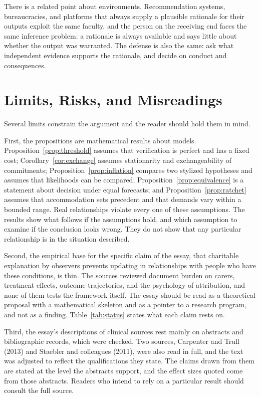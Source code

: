 \documentclass[11pt]{article}
\theoremstyle{definition}
\theoremstyle{remark}
\begin{document}
There is a related point about environments. Recommendation systems, bureaucracies, and platforms that always supply a plausible rationale for their outputs exploit the same faculty, and the person on the receiving end faces the same inference problem: a rationale is always available and says little about whether the output was warranted. The defense is also the same: ask what independent evidence supports the rationale, and decide on conduct and consequences.

\section{Limits, Risks, and Misreadings}\label{sec:limits}

Several limits constrain the argument and the reader should hold them in mind.

First, the propositions are mathematical results about models. Proposition~\ref{prop:threshold} assumes that verification is perfect and has a fixed cost; Corollary~\ref{cor:exchange} assumes stationarity and exchangeability of commitments; Proposition~\ref{prop:inflation} compares two stylized hypotheses and assumes that likelihoods can be compared; Proposition~\ref{prop:equivalence} is a statement about decision under equal forecasts; and Proposition~\ref{prop:ratchet} assumes that accommodation sets precedent and that demands vary within a bounded range. Real relationships violate every one of these assumptions. The results show what follows if the assumptions hold, and which assumption to examine if the conclusion looks wrong. They do not show that any particular relationship is in the situation described.

Second, the empirical base for the specific claim of the essay, that charitable explanation by observers prevents updating in relationships with people who have these conditions, is thin. The sources reviewed document burden on carers, treatment effects, outcome trajectories, and the psychology of attribution, and none of them tests the framework itself. The essay should be read as a theoretical proposal with a mathematical skeleton and as a pointer to a research program, and not as a finding. Table~\ref{tab:status} states what each claim rests on.

Third, the essay's descriptions of clinical sources rest mainly on abstracts and bibliographic records, which were checked. Two sources, Carpenter and Trull (2013) and Staebler and colleagues (2011), were also read in full, and the text was adjusted to reflect the qualifications they state. The claims drawn from them are stated at the level the abstracts support, and the effect sizes quoted come from those abstracts. Readers who intend to rely on a particular result should consult the full source.
\end{document}
